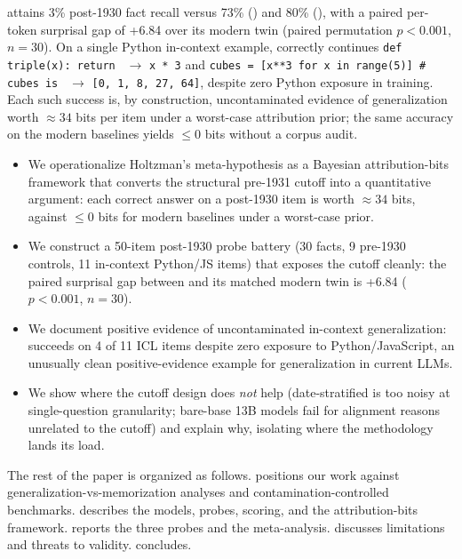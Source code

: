 \talkienineteen attains 3\% post-1930 fact recall versus 73\% (\talkieweb) and 80\% (\gptfour), with a paired per-token surprisal gap of +6.84 \bpt over its modern twin (paired permutation $p < 0.001$, $n=30$). On a single Python in-context example, \talkienineteen correctly continues \texttt{def triple(x): return } $\to$ \texttt{x * 3} and \texttt{cubes = [x**3 for x in range(5)] \# cubes is } $\to$ \texttt{[0, 1, 8, 27, 64]}, despite zero Python exposure in training. Each such success is, by construction, uncontaminated evidence of generalization worth $\approx 34$ bits per item under a worst-case attribution prior; the same accuracy on the modern baselines yields $\le 0$ bits without a corpus audit.

\begin{itemize}[leftmargin=*,itemsep=0pt,topsep=0pt]
    \item We operationalize Holtzman's meta-hypothesis as a Bayesian attribution-bits framework that converts the structural pre-1931 cutoff into a quantitative argument: each correct \talkienineteen answer on a post-1930 item is worth $\approx 34$ bits, against $\le 0$ bits for modern baselines under a worst-case prior.
    \item We construct a 50-item post-1930 probe battery (30 facts, 9 pre-1930 controls, 11 in-context Python/JS items) that exposes the cutoff cleanly: the paired surprisal gap between \talkienineteen and its matched modern twin is +6.84 \bpt ($p < 0.001$, $n=30$).
    \item We document positive evidence of uncontaminated in-context generalization: \talkienineteen succeeds on 4 of 11 ICL items despite zero exposure to Python/JavaScript, an unusually clean positive-evidence example for generalization in current LLMs.
    \item We show where the cutoff design does \emph{not} help (date-stratified \mmlu is too noisy at single-question granularity; bare-base 13B models fail \humaneval for alignment reasons unrelated to the cutoff) and explain why, isolating where the methodology lands its load.
\end{itemize}

The rest of the paper is organized as follows.  positions our work against generalization-vs-memorization analyses and contamination-controlled benchmarks.  describes the models, probes, scoring, and the attribution-bits framework.  reports the three probes and the meta-analysis.  discusses limitations and threats to validity.  concludes.
